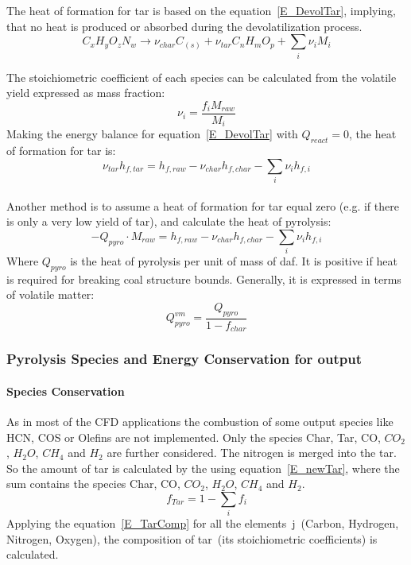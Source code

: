 The heat of formation for tar is based on the equation~\ref{E_DevolTar}, implying, that no heat is produced or absorbed during the devolatilization process.
\begin{equation}\label{E_DevolTar}
 C_x H_y O_z N_w \rightarrow \nu_{char}C_{(s)} + \nu_{tar} C_n H_m O_p + \sum_i \nu_i M_i
\end{equation}

The stoichiometric coefficient of each species can be calculated from the volatile yield expressed
as mass fraction:
\begin{equation}\label{E_myTar}
 \nu_i = \frac{f_i M_{raw}}{M_i}
\end{equation}
Making the energy balance for equation~\ref{E_DevolTar} with $Q_{react}=0$, the heat of formation for tar is:
\begin{equation}\label{E_Tar_hf}
 \nu_{tar} h_{f,tar} = h_{f,raw} - \nu_{char} h_{f,char} - \sum_i \nu_i h_{f,i}
\end{equation}\\

Another method is to assume a heat of formation for tar equal zero (e.g. if there is only a very low yield of tar), and calculate the heat of pyrolysis:
\begin{equation}
 - Q_{pyro} \cdot M_{raw} = h_{f,raw} - \nu_{char} h_{f,char} - \sum_i \nu_i h_{f,i}
\end{equation}
Where $Q_{pyro}$ is the heat of pyrolysis per unit of mass of daf. It is positive if heat is
required for breaking coal structure bounds. Generally, it is expressed in terms of volatile matter:
\begin{equation}\label{E_QPyro}
 Q_{pyro}^{vm} = \frac{Q_{pyro}}{1-f_{char}}
\end{equation}

\subsubsection{Pyrolysis Species and Energy Conservation for \FGDVC  output}\label{SSS_ConsEqFGDVC}
\paragraph{Species Conservation}
As in most of the CFD applications the combustion of some \FGDVC output species like HCN, COS or Olefins are not implemented. Only the species Char, Tar, CO, $CO_2$, $H_2O$, $CH_4$ and $H_2$ are further considered. The nitrogen is merged into the tar. So the amount of tar is calculated by the using equation~\ref{E_newTar}, where the sum contains the species Char, CO, $CO_2$, $H_2O$, $CH_4$ and $H_2$.
\begin{equation}\label{E_newTar}
 f_{Tar}=1-\sum_i f_i
\end{equation}
Applying the equation~\ref{E_TarComp} for all the elements~j~(Carbon, Hydrogen, Nitrogen, Oxygen), the composition of tar~(its stoichiometric coefficients) is calculated.\\


